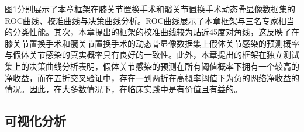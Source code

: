 \begin{figure}[htbp]
  \newline
  \label{fig:chap03_ROC_CC_DAC}
\end{figure}

图\ref{fig:chap03_ROC_CC_DAC}分别展示了本章框架在膝关节置换手术和髋关节置换手术动态骨显像数据集的ROC曲线、校准曲线与决策曲线分析。ROC曲线展示了本章框架与三名专家相当的分类性能。其次，本章提出的框架的校准曲线较为贴近45度对角线，这反映了在膝关节置换手术和髋关节置换手术的动态骨显像数据集上假体关节感染的预测概率与假体关节感染的真实概率具有良好的一致性。此外，本章提出的框架在独立测试集上的决策曲线分析表明，假体关节感染的预测在所有阈值概率下拥有一个较高的净收益，而在五折交叉验证中，存在一到两折在高概率阈值下为负的网络净收益的情况。因此，在大多数情况下，在临床实践中是有价值且有益的。

\subsection{可视化分析}

